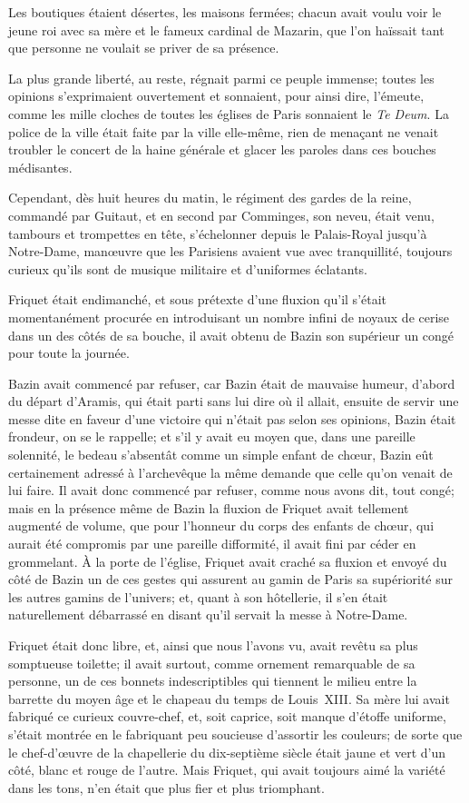 Les boutiques étaient désertes, les maisons fermées; chacun avait voulu voir le jeune roi avec sa mère et le fameux cardinal de Mazarin, que l'on haïssait tant que personne ne voulait se priver de sa présence.

La plus grande liberté, au reste, régnait parmi ce peuple immense; toutes les opinions s'exprimaient ouvertement et sonnaient, pour ainsi dire, l'émeute, comme les mille cloches de toutes les églises de Paris sonnaient le \textit{Te Deum}. La police de la ville était faite par la ville elle-même, rien de menaçant ne venait troubler le concert de la haine générale et glacer les paroles dans ces bouches médisantes.

Cependant, dès huit heures du matin, le régiment des gardes de la reine, commandé par Guitaut, et en second par Comminges, son neveu, était venu, tambours et trompettes en tête, s'échelonner depuis le Palais-Royal jusqu'à Notre-Dame, manœuvre que les Parisiens avaient vue avec tranquillité, toujours curieux qu'ils sont de musique militaire et d'uniformes éclatants.

Friquet était endimanché, et sous prétexte d'une fluxion qu'il s'était momentanément procurée en introduisant un nombre infini de noyaux de cerise dans un des côtés de sa bouche, il avait obtenu de Bazin son supérieur un congé pour toute la journée.

Bazin avait commencé par refuser, car Bazin était de mauvaise humeur, d'abord du départ d'Aramis, qui était parti sans lui dire où il allait, ensuite de servir une messe dite en faveur d'une victoire qui n'était pas selon ses opinions, Bazin était frondeur, on se le rappelle; et s'il y avait eu moyen que, dans une pareille solennité, le bedeau s'absentât comme un simple enfant de chœur, Bazin eût certainement adressé à l'archevêque la même demande que celle qu'on venait de lui faire. Il avait donc commencé par refuser, comme nous avons dit, tout congé; mais en la présence même de Bazin la fluxion de Friquet avait tellement augmenté de volume, que pour l'honneur du corps des enfants de chœur, qui aurait été compromis par une pareille difformité, il avait fini par céder en grommelant. À la porte de l'église, Friquet avait craché sa fluxion et envoyé du côté de Bazin un de ces gestes qui assurent au gamin de Paris sa supériorité sur les autres gamins de l'univers; et, quant à son hôtellerie, il s'en était naturellement débarrassé en disant qu'il servait la messe à Notre-Dame.

Friquet était donc libre, et, ainsi que nous l'avons vu, avait revêtu sa plus somptueuse toilette; il avait surtout, comme ornement remarquable de sa personne, un de ces bonnets indescriptibles qui tiennent le milieu entre la barrette du moyen âge et le chapeau du temps de Louis~XIII. Sa mère lui avait fabriqué ce curieux couvre-chef, et, soit caprice, soit manque d'étoffe uniforme, s'était montrée en le fabriquant peu soucieuse d'assortir les couleurs; de sorte que le chef-d'œuvre de la chapellerie du dix-septième siècle était jaune et vert d'un côté, blanc et rouge de l'autre. Mais Friquet, qui avait toujours aimé la variété dans les tons, n'en était que plus fier et plus triomphant.

